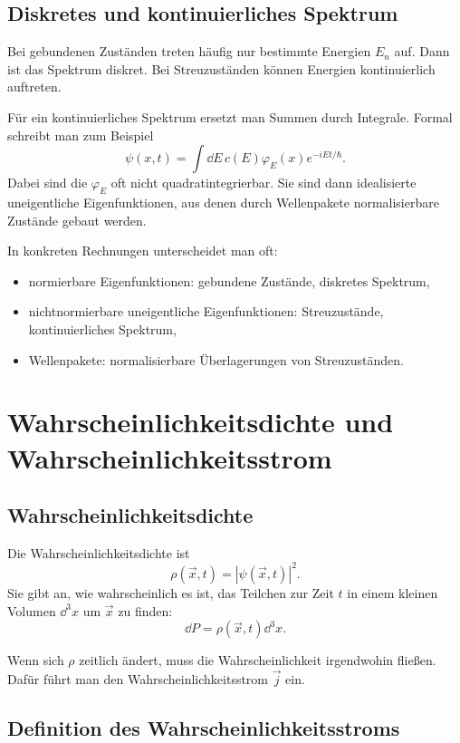 \subsection{Diskretes und kontinuierliches Spektrum}

Bei gebundenen Zuständen treten häufig nur bestimmte Energien $E_n$ auf. Dann ist das Spektrum diskret. Bei Streuzuständen können Energien kontinuierlich auftreten.

Für ein kontinuierliches Spektrum ersetzt man Summen durch Integrale. Formal schreibt man zum Beispiel
\[
    \psi(x,t)=\int \dd E\,c(E)\varphi_E(x)e^{-iEt/\hbar}.
\]
Dabei sind die $\varphi_E$ oft nicht quadratintegrierbar. Sie sind dann idealisierte uneigentliche Eigenfunktionen, aus denen durch Wellenpakete normalisierbare Zustände gebaut werden.

\begin{notebox}
In konkreten Rechnungen unterscheidet man oft:
\begin{itemize}
    \item normierbare Eigenfunktionen: gebundene Zustände, diskretes Spektrum,
    \item nichtnormierbare uneigentliche Eigenfunktionen: Streuzustände, kontinuierliches Spektrum,
    \item Wellenpakete: normalisierbare Überlagerungen von Streuzuständen.
\end{itemize}
\end{notebox}

\section{Wahrscheinlichkeitsdichte und Wahrscheinlichkeitsstrom}

\subsection{Wahrscheinlichkeitsdichte}

Die Wahrscheinlichkeitsdichte ist
\[
    \rho(\vec{x},t)=|\psi(\vec{x},t)|^2.
\]
Sie gibt an, wie wahrscheinlich es ist, das Teilchen zur Zeit $t$ in einem kleinen Volumen $\dd^3x$ um $\vec{x}$ zu finden:
\[
    \dd P=\rho(\vec{x},t)\dd^3x.
\]

Wenn sich $\rho$ zeitlich ändert, muss die Wahrscheinlichkeit irgendwohin fließen. Dafür führt man den Wahrscheinlichkeitsstrom $\vec{j}$ ein.

\subsection{Definition des Wahrscheinlichkeitsstroms}

